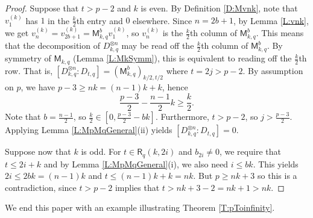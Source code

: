 \documentclass[12pt,reqno]{amsart}
\newcommand{\Rect}{\mathsf{R}}
\renewcommand{\geq}{\geqslant}
\renewcommand{\leq}{\leqslant}
\newcommand{\M}{\mathsf{M}}
\theoremstyle{definition}
\numberwithin{equation}{section}
\begin{document}
\begin{proof}
  
  
   Suppose that $t>p-2$ and $k$ is even. By Definition \ref{D:Mvnk}, note that $v_1^{(k)}$ has $1$ in the $\frac{k}{2}$th entry and $0$ elsewhere. Since $n = 2b+1$, by Lemma \ref{L:vnk}, we get $v_{n}^{(k)} = v_{2b+1}^{(k)} = \M_{k,q}^b v_1^{(k)}$, so $v_n^{(k)}$ is the $\frac{k}{2}$th column of $\M_{k,q}^b$.  This means that  the decomposition of $D_{k,q}^{\otimes n}$ may be read off the $\frac{k}{2}$th column of $\M_{k,q}^b$. By symmetry of $\M_{k,q}$ (Lemma \ref{L:MkSymm}), this is equivalent to reading off the $\frac{k}{2}$th row. That is, $[D_{k,q}^{\otimes n} : D_{t,q}] = (\M_{k,q}^b)_{k/2, t/2}$ where $t = 2j > p-2$. By assumption on $p$, we have $p-3 \geq nk = (n-1)k + k$, hence \[\frac{p-3}{2} - \frac{n-1}{2} k \geq \frac{k}{2}.\] Note that $b = \frac{n-1}{2}$, so $\frac{k}{2} \in [0, \frac{p-3}{2} - bk]$. Furthermore, $t > p-2$, so $j > \frac{p-3}{2}$. Applying Lemma \ref{L:MpMqGeneral}(ii) yields $[D_{k,q}^{\otimes n} : D_{t,q}] = 0$.
  
  
  Suppose now that $k$ is odd. For $t\in\Rect_q(k,2i)$ and $b_{2i}\neq 0$, we require that $t\leq 2i+k$ and by Lemma \ref{L:MpMqGeneral}(i), we also need $i \leq bk$. This yields $2i \leq 2bk  = (n-1)k$ and $t \leq  (n-1)k+ k = nk$. But $p \geq nk +3$ so this is a contradiction, since $t > p-2$ implies that $t > nk+3-2 = nk+1 > nk$.
\end{proof}

We end this paper with an example illustrating Theorem \ref{T:pToinfinity}. 
\end{document}
